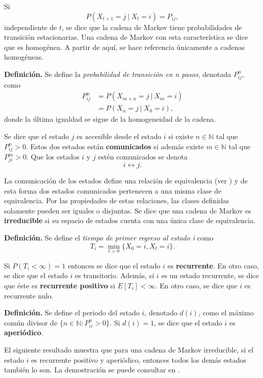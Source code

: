 \documentclass[11pt,a4paper]{article}
\begin{document}
Si $$P\left( X_{t+1} = j \ | \ X_t = i\right) = P_{ij},$$ independiente de $t$, se dice que la cadena de Markov tiene probabilidades de transición estacionarias. Una cadena de Markov con esta característica se dice que es homogénea. A partir de aquí, se hace referencia únicamente a cadenas homogéneas.

\textbf{Definición.} Se define la \textit{probabilidad de transición en n pasos}, denotada $P_{ij}^n$, como
\begin{align*}
P_{ij}^n &= P\left( X_{m+n} = j \ | \ X_{m} = i\right)\\
&= P\left( X_n = j \ | \ X_0 = i \right),
\end{align*}
donde la última igualdad se sigue de la homogeneidad de la cadena.

Se dice que el estado $j$ es accesible desde el estado $i$ si existe $n \in \mathbb{N}$ tal que $P_{ij}^n > 0$. Estos dos estados están \textbf{comunicados} si además existe $m \in \mathbb{N}$ tal que $P_{ji}^m > 0$. Que los estados $i$ y $j$ estén comunicados se denota
\begin{equation} \label{clase_eq}
i \leftrightarrow j.
\end{equation}

La comunicación de los estados define una relación de equivalencia (ver \citet{ross}) y de esta forma dos estados comunicados pertenecen a una misma clase de equivalencia. Por las propiedades de estas relaciones, las clases definidas solamente pueden ser iguales o disjuntas. Se dice que una cadena de Markov es \textbf{irreducible} si su espacio de estados cuenta con una única clase de equivalencia.

\textbf{Definición.} Se define el \textit{tiempo de primer regreso al estado i} como $$T_i = \min_{t>0} \lbrace X_0 = i, X_t = i \rbrace.$$

Si $P\left( T_i < \infty \right) = 1 $ entonces se dice que el estado $i$ es \textbf{recurrente}. En otro caso, se dice que el estado $i$ es transitorio. Además, si $i$ es un estado recurrente, se dice que éste es \textbf{recurrente positivo} si $E\left[T_i\right] < \infty$. En otro caso, se dice que $i$ es recurrente nulo.

\textbf{Definición.} Se define el periodo del estado $i$, denotado $d(i)$, como el máximo común divisor de $\lbrace n\in \mathbb{N}: P_{ii}^n > 0\rbrace.$ Si $d(i)=1$, se dice que el estado $i$ es \textbf{aperiódico}.

El siguiente resultado muestra que para una cadena de Markov irreducible, si el estado $i$ es recurrente positivo y aperiódico, entonces todos los demás estados también lo son. La demostración se puede consultar en \citet{ross}.
\end{document}
